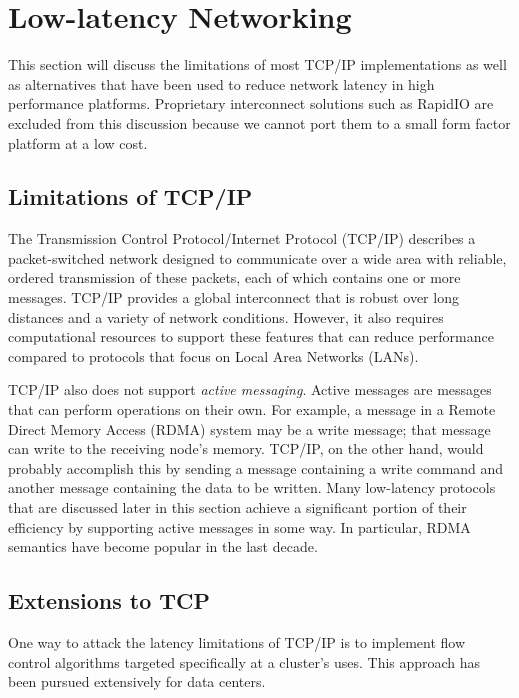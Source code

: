 \documentclass[11pt]{book}
\begin{document}
\section{\textbf{Low-latency Networking}}

This section will discuss the limitations of most TCP/IP implementations as well
as alternatives that have been used to reduce network latency in high
performance platforms. Proprietary interconnect solutions such as
RapidIO are excluded from this discussion because we cannot port them to a
small form factor platform at a low cost.

\subsection{\textbf{Limitations of TCP/IP}}

The Transmission Control Protocol/Internet Protocol (TCP/IP) describes a
packet-switched network designed to communicate over a wide area with reliable,
ordered transmission of these packets, each of which contains one or more
messages. TCP/IP provides a global interconnect that is robust over long
distances and a variety of network conditions. However, it also requires
computational resources to support these features that can reduce performance
compared to protocols that focus on Local Area Networks (LANs).

TCP/IP also does not support \textit{active messaging}. Active messages are
messages that can perform operations on their own. For example, a message in a
Remote Direct Memory Access (RDMA) system may be a write message; that message
can write to the receiving node's memory. TCP/IP, on the other hand, would
probably accomplish this by sending a message containing a write command and
another message containing the data to be written. Many low-latency protocols
that are discussed later in this section achieve a significant portion of their
efficiency by supporting active messages in some way. In particular, RDMA
semantics have become popular in the last decade.

\subsection{\textbf{Extensions to TCP}}

One way to attack the latency limitations of TCP/IP is to implement flow control
algorithms targeted specifically at a cluster's uses. This approach has been
pursued extensively for data centers.
\end{document}

